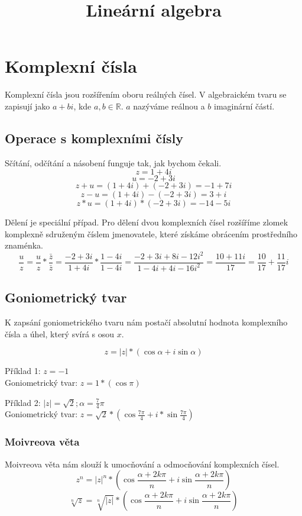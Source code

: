 \documentclass[12pt, a4paper]{scrartcl}
\title{Lineární algebra}
\begin{document}
    \maketitle
    \tableofcontents

    \section{Komplexní čísla}
    Komplexní čísla jsou rozšířením oboru reálných čísel.
    V algebraickém tvaru se zapisují jako $a + bi$,
    kde $a,b \in \mathds{R}$. $a$ nazýváme reálnou a $b$ imaginární částí. 

    \subsection{Operace s komplexními čísly}
    Sčítání, odčítání a násobení funguje tak, jak bychom čekali.
    \[z = 1 + 4i\]
    \[u = -2 + 3i\]
    \[z + u=(1 + 4i) + (-2 + 3i) = -1 + 7i\]
    \[z - u=(1 + 4i) - (-2 + 3i) = 3 + i\]
    \[z * u=(1 + 4i) * (-2 + 3i) = -14 - 5i\]

    Dělení je speciální případ. Pro dělení dvou 
    komplexních čísel rozšíříme zlomek komplexně sdruženým číslem jmenovatele,
    které získáme obrácením prostředního znaménka.
    \[\frac{u}{z} = \frac{u}{z} * \frac{\bar{z}}{\bar{z}} =
    \frac{-2 + 3i}{1 + 4i} * \frac{1 - 4i}{1 - 4i}=\frac{-2 + 3i + 8i - 12i^2}{1 - 4i + 4i - 16i^2} =
    \frac{10 + 11i}{17} = \frac{10}{17} + \frac{11}{17}i\]

    \subsection{Goniometrický tvar}
    K zapsání goniometrického tvaru nám postačí absolutní hodnota komplexního
    čísla a úhel, který svírá s osou $x$.

    \[z = |z| * (\cos \alpha + i \sin \alpha)\]

    Příklad 1: $z = -1$ \\
    Goniometrický tvar: $z = 1 * (\cos \pi)$

    Příklad 2: $|z| = \sqrt{2}; \alpha = \frac{7}{4} \pi$ \\
    Goniometrický tvar: $z = \sqrt{2} * (\cos \frac{7 \pi}{4} + i * \sin \frac{7 \pi}{4})$
    
    \subsubsection{Moivreova věta}
    Moivreova věta nám slouží k umocňování a odmocňování komplexních čísel.
    \[z^n = |z|^n * (\cos \frac{\alpha + 2k \pi}{n} + i \sin \frac{\alpha + 2k \pi}{n})\]
    \[\sqrt[n]{z} = \sqrt[n]{|z|} * (\cos \frac{\alpha + 2k \pi}{n} + i \sin \frac{\alpha + 2k \pi}{n})\]
\end{document}
